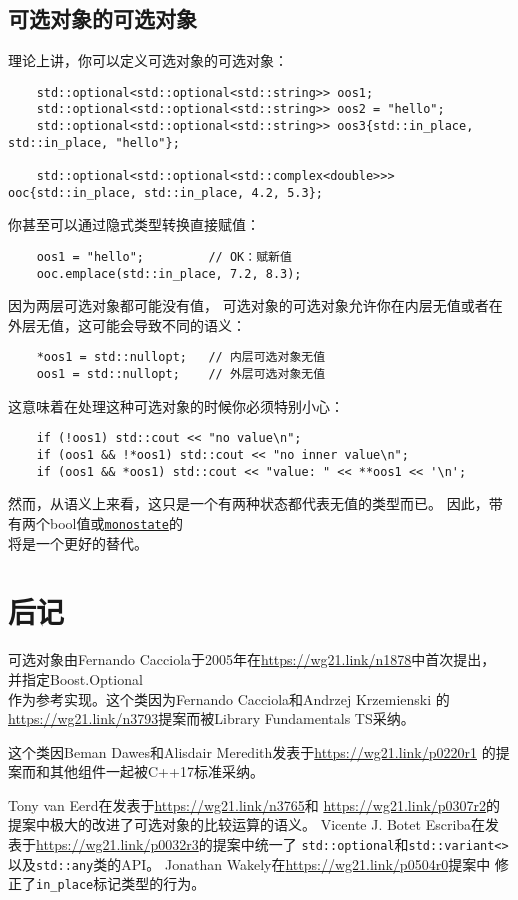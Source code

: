 \subsection{可选对象的可选对象}
理论上讲，你可以定义可选对象的可选对象：
\begin{lstlisting}
    std::optional<std::optional<std::string>> oos1;
    std::optional<std::optional<std::string>> oos2 = "hello";
    std::optional<std::optional<std::string>> oos3{std::in_place, std::in_place, "hello"};

    std::optional<std::optional<std::complex<double>>> ooc{std::in_place, std::in_place, 4.2, 5.3};
\end{lstlisting}
你甚至可以通过隐式类型转换直接赋值：
\begin{lstlisting}
    oos1 = "hello";         // OK：赋新值
    ooc.emplace(std::in_place, 7.2, 8.3);
\end{lstlisting}
因为两层可选对象都可能没有值，
可选对象的可选对象允许你在内层无值或者在外层无值，这可能会导致不同的语义：
\begin{lstlisting}
    *oos1 = std::nullopt;   // 内层可选对象无值
    oos1 = std::nullopt;    // 外层可选对象无值
\end{lstlisting}
这意味着在处理这种可选对象的时候你必须特别小心：
\begin{lstlisting}
    if (!oos1) std::cout << "no value\n";
    if (oos1 && !*oos1) std::cout << "no inner value\n";
    if (oos1 && *oos1) std::cout << "value: " << **oos1 << '\n';
\end{lstlisting}
然而，从语义上来看，这只是一个有两种状态都代表无值的类型而已。
因此，带有两个bool值或\hyperref[ch16.2.1]{\texttt{monostate}}的\\
将是一个更好的替代。

\section{后记}
可选对象由Fernando Cacciola于2005年在\url{https://wg21.link/n1878}中首次提出，
并指定Boost.Optional\\
作为参考实现。这个类因为Fernando Cacciola和Andrzej Krzemienski
的\url{https://wg21.link/n3793}提案而被Library Fundamentals TS采纳。

这个类因Beman Dawes和Alisdair Meredith发表于\url{https://wg21.link/p0220r1}
的提案而和其他组件一起被C++17标准采纳。

Tony van Eerd在发表于\url{https://wg21.link/n3765}和
\url{https://wg21.link/p0307r2}的提案中极大的改进了可选对象的比较运算的语义。
Vicente J. Botet Escriba在发表于\url{https://wg21.link/p0032r3}的提案中统一了
\texttt{std::optional}和\texttt{std::variant<>}以及\texttt{std::any}类的API。
Jonathan Wakely在\url{https://wg21.link/p0504r0}提案中
修正了\texttt{in\_place}标记类型的行为。
